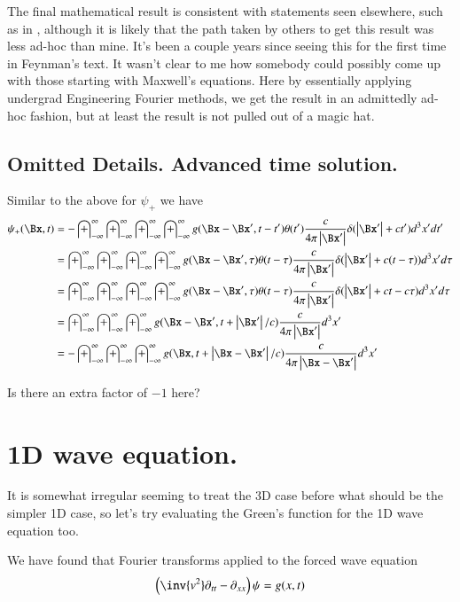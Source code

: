 \documentclass{article}
\newcommand{\IIinf}[0]{ \int_{-\infty}^\infty }
\begin{document}
The final mathematical result is consistent with statements seen elsewhere, such as in \cite{feynman1963flp}, although it is
likely that the path taken by others to get this result was less ad-hoc than mine.
It's been a couple years since seeing this for the
first time in Feynman's text.
It wasn't clear to me how somebody could possibly come up with those starting with Maxwell's equations.
Here by essentially applying undergrad Engineering Fourier methods, we get the result in an admittedly ad-hoc fashion, but at least the result is not
pulled out of a magic hat.

\subsection{ Omitted Details.  Advanced time solution. }

Similar to the above for $\psi_{+}$ we have
\begin{align*}
{\psi}_{+}(\Bx, t)
&= -\IIinf \IIinf \IIinf \IIinf g(\Bx - \Bx', t - t') \theta(t') \frac{c }{4\pi \Abs{\Bx'}} \delta(\Abs{\Bx'} + c t') d^3 x' dt' \\
&= \IIinf \IIinf \IIinf \IIinf g(\Bx - \Bx', \tau) \theta(t -\tau) \frac{c }{4\pi \Abs{\Bx'}} \delta(\Abs{\Bx'} + c (t -\tau)) d^3 x' d\tau \\
&= \IIinf \IIinf \IIinf \IIinf g(\Bx - \Bx', \tau) \theta(t -\tau) \frac{c }{4\pi \Abs{\Bx'}} \delta(\Abs{\Bx'} + c t -c\tau) d^3 x' d\tau \\
&= \IIinf \IIinf \IIinf g(\Bx - \Bx', t + \Abs{\Bx'}/c) \frac{c }{4\pi \Abs{\Bx'}} d^3 x' \\
&= -\IIinf \IIinf \IIinf g(\Bx, t + \Abs{\Bx -\Bx'}/c) \frac{c }{4\pi \Abs{\Bx -\Bx'}} d^3 x' \\
\end{align*}

Is there an extra factor of $-1$ here?

\section{ 1D wave equation. }

It is somewhat irregular seeming to treat the 3D case before what should be the simpler 1D case, so let's
try evaluating the Green's function for the 1D wave equation too.

We have found that Fourier transforms applied to the forced wave equation
\begin{align}
\left( \inv{v^2} \partial_{tt} -\partial_{xx} \right)\psi = g(x,t)
\end{align}
\end{document}
